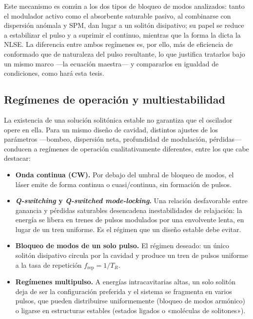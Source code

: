 Este mecanismo es común a los dos tipos de bloqueo de modos analizados: tanto el
modulador activo como el absorbente saturable pasivo, al combinarse con dispersión
anómala y SPM, dan lugar a un solitón disipativo; su papel se reduce a estabilizar
el pulso y a suprimir el continuo, mientras que la forma la dicta la NLSE. La
diferencia entre ambos regímenes es, por ello, más de eficiencia de conformado que
de naturaleza del pulso resultante, lo que justifica tratarlos bajo un mismo marco
—la ecuación maestra— y compararlos en igualdad de condiciones, como hará esta
tesis.

\subsection{Regímenes de operación y multiestabilidad}
\label{sec:regimenes}

La existencia de una solución solitónica estable no garantiza que el oscilador
opere en ella. Para un mismo diseño de cavidad, distintos ajustes de los
parámetros —bombeo, dispersión neta, profundidad de modulación, pérdidas— conducen
a regímenes de operación cualitativamente diferentes, entre los que cabe destacar:

\begin{itemize}
    \item \textbf{Onda continua (CW).} Por debajo del umbral de bloqueo de modos,
    el láser emite de forma continua o cuasi\-/continua, sin formación de pulsos.

    \item \textbf{\emph{Q-switching} y \emph{Q-switched mode-locking}.} Una
    relación desfavorable entre ganancia y pérdidas saturables desencadena
    inestabilidades de relajación: la energía se libera en trenes de pulsos
    modulados por una envolvente lenta, en lugar de un tren uniforme. Es el régimen
    que un diseño estable debe evitar.

    \item \textbf{Bloqueo de modos de un solo pulso.} El régimen deseado: un único
    solitón disipativo circula por la cavidad y produce un tren de pulsos uniforme
    a la tasa de repetición $f_{\text{rep}}=1/T_R$.

    \item \textbf{Regímenes multipulso.} A energías intracavitarias altas, un solo
    solitón deja de ser la configuración preferida y el sistema se fragmenta en
    varios pulsos, que pueden distribuirse uniformemente (bloqueo de modos
    armónico) o ligarse en estructuras estables (estados ligados o «moléculas de
    solitones»).
\end{itemize}

